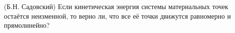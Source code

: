 (Б.Н. Садовский)
Если кинетическая энергия системы материальных точек остаётся
неизменной, то верно ли, что все её точки движутся равномерно и
прямолинейно?
